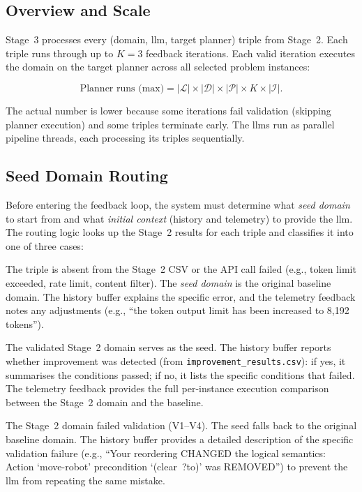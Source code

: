 \subsection{Overview and Scale}
\label{sec:design:stage3:overview}

Stage~3 processes every (domain, \gls{llm}, target planner) triple from Stage~2.
Each triple runs through up to $K{=}3$ feedback iterations.
Each valid iteration executes the domain on the target planner across all selected problem instances:

\begin{equation}\label{eq:stage3_max_runs}
  \text{Planner runs (max)} = |\mathcal{L}| \times |\mathcal{D}| \times |\mathcal{P}| \times K \times |\mathcal{I}|.
\end{equation}

\noindent The actual number is lower because some iterations fail validation (skipping planner execution) and some triples terminate early.
The \glspl{llm} run as parallel pipeline threads, each processing its triples sequentially.

\subsection{Seed Domain Routing}
\label{sec:design:stage3:seed}

Before entering the feedback loop, the system must determine what \emph{seed domain} to start from and what \emph{initial context} (history and telemetry) to provide the \gls{llm}.
The routing logic looks up the Stage~2 results for each triple and classifies it into one of three cases:

\begin{description}[style=nextline, leftmargin=1.0cm]
  \item[\textbf{Case~A} --- Stage~2 LLM Error:]
    The triple is absent from the Stage~2 CSV or the API call failed (e.g., token limit exceeded, rate limit, content filter).
    The \emph{seed domain} is the original baseline domain.
    The history buffer explains the specific error, and the telemetry feedback notes any adjustments (e.g., ``the token output limit has been increased to 8,192 tokens'').

  \item[\textbf{Case~B} --- Stage~2 Produced a Valid Domain:]
    The validated Stage~2 domain serves as the seed.
    The history buffer reports whether improvement was detected (from \texttt{improvement\_results.csv}): if yes, it summarises the conditions passed; if no, it lists the specific conditions that failed.
    The telemetry feedback provides the full per-instance execution comparison between the Stage~2 domain and the baseline.

  \item[\textbf{Case~C} --- Stage~2 Produced an Invalid Domain:]
    The Stage~2 domain failed validation (V1--V4).
    The seed falls back to the original baseline domain.
    The history buffer provides a detailed description of the specific validation failure (e.g., ``Your reordering CHANGED the logical semantics: Action `move-robot' precondition `(clear~?to)' was REMOVED'') to prevent the \gls{llm} from repeating the same mistake.
\end{description}

